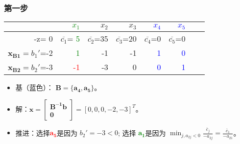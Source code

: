 	\subsubsection{第一步}
		\begin{table}[h]
		\centering
\begin{tabular}{r|rrrrrrr}\hline
  & \textcolor{green}{$x_1$} & $x_2$ & $x_3$ & \textcolor{blue}{$x_4$} & \textcolor{blue}{$x_5$} \\
\hline
 -z= 0 & $\overline{c_1}$= \textcolor{green}{5}  & $\overline{c_2}$=35 & $\overline{c_3}$=20 & $\overline{c_4}$=0 & $\overline{c_5}$=0  \\
 \hline
 $\mathbf{x_{B1}} = b_1'$=-2& \textcolor{green}{1} & -1   & -1 & \textcolor{blue}{1} & \textcolor{blue}{0}  \\
 $\mathbf{x_{B2}} = b_2'$=-3 & \textcolor{red}{-1} & -3 & 0  & \textcolor{blue}{0} & \textcolor{blue}{1}  \\
\hline
\end{tabular}
\end{table}
	\begin{itemize}
		\item 基（蓝色）： $\mathbf{B =\{a_4, a_5 \} }$。
		\item 解：$\mathbf{x=\left[\begin{array}{c}\mathbf{B^{-1}b}\\\mathbf{0}\end{array}\right]}= [ 0, 0, 0, -2, -3 ]^T$。
		\item 推进：选择\textcolor{red}{$\mathbf{a_5}$}是因为 $b_2' = -3  < 0$; 选择 \textcolor{green}{$\mathbf{a_1}$}是因为 $\min_{j, a_{2j}<0} \frac{\overline{c}_j }{-a_{2j} } = \frac{ \overline{c}_1 }{-a_{21} }$。
	\end{itemize}
